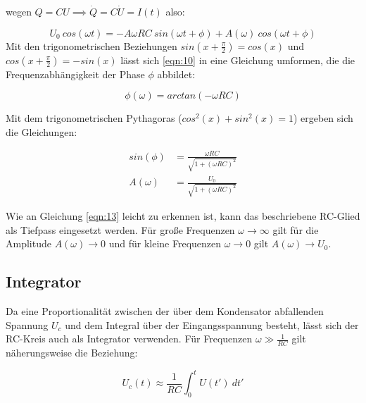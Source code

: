 wegen $Q=CU \implies \dot{Q} = C \dot{U} = I(t)$ also:

\begin{equation}
\label{eqn:10}
U_0 \ cos(\omega t) = -A\omega RC \ sin(\omega t + \phi) + A(\omega) \ cos(\omega t + \phi)
\end{equation}
\newpage
Mit den trigonometrischen Beziehungen $sin\left(x+\frac{\pi}{2}\right) = cos(x)$ und \\ $cos\left(x+\frac{\pi}{2}\right) = -sin(x)$ lässt sich \eqref{eqn:10} in eine Gleichung umformen, die die Frequenzabhängigkeit der Phase $\phi$ abbildet:

\begin{equation}
\label{eqn:11}
\phi(\omega) = arctan(-\omega RC)
\end{equation}

Mit dem trigonometrischen Pythagoras ($cos^2(x) + sin^2(x) = 1$) ergeben sich die Gleichungen:


\begin{align}
  sin(\phi) &= \frac{\omega RC}{\sqrt{1+ (\omega RC)^2}} \label{eqn:12} \\
  A(\omega) &= \frac{U_0}{\sqrt{1+ (\omega RC)^2}} \label{eqn:13}
\end{align}

Wie an Gleichung \eqref{eqn:13} leicht zu erkennen ist, kann das beschriebene RC-Glied als Tiefpass eingesetzt werden. Für große Frequenzen $\omega \rightarrow \infty$ gilt für die Amplitude $A(\omega) \rightarrow 0$ und für kleine Frequenzen $\omega \rightarrow 0$ gilt $A(\omega) \rightarrow U_0$.

\subsection{Integrator}
Da eine Proportionalität zwischen der über dem Kondensator abfallenden Spannung $U_c$ und dem Integral über der Eingangsspannung besteht, lässt sich der RC-Kreis auch als Integrator verwenden. Für Frequenzen $\omega \gg \frac{1}{RC}$ gilt näherungsweise die Beziehung:

\begin{equation}
U_c(t) \approx \frac{1}{RC} \int_0^{t} U(t') \ dt'
\end{equation}
